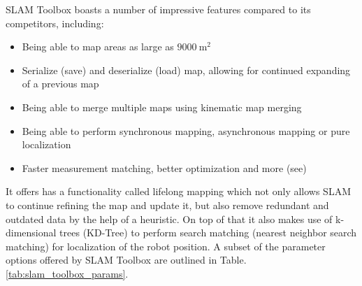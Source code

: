 
SLAM Toolbox boasts a number of impressive features compared to its competitors, including\:\cite{macenski_slam_2021}:
\begin{itemize}
    \item Being able to map areas as large as $9000\:\text{m}^2$
    \item Serialize (save) and deserialize (load) map, allowing for continued expanding of a previous map
    \item Being able to merge multiple maps using kinematic map merging
    \item Being able to perform synchronous mapping, asynchronous mapping or pure localization
    \item Faster measurement matching, better optimization and more (see\:\cite{macenski_slam_2021})
\end{itemize}
It offers has a functionality called lifelong mapping which not only allows SLAM to continue refining the map and update it, but also remove redundant and outdated data by the help of a heuristic\:\cite{macenski_use_2019}. 
On top of that it also makes use of k-dimensional trees (KD-Tree) to perform search matching (nearest neighbor search matching) for localization of the robot position\:\cite{macenski_slam_2021}.
A subset of the parameter options offered by SLAM Toolbox are outlined in Table.\:\ref{tab:slam_toolbox_params}\:\cite{macenski_slam_2021}\cite{macenski_use_2019}.
